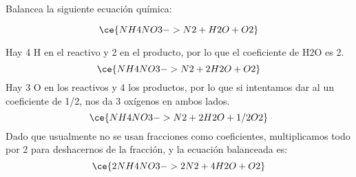 Balancea la siguiente ecuación química:

\[
    \ce{NH4NO3 -> N2 + H2O + O2}
\]

\begin{solutionbox}{8cm}
    Hay 4 H en el reactivo y 2 en el producto, por lo que el coeficiente de H2O es 2.
    \[
        \ce{NH4NO3 -> N2 + 2H2O + O2}
    \]
    Hay 3 O en los reactivos y 4 los productos, por lo que si intentamos dar al  un coeficiente de 1/2, nos da 3 oxígenos en ambos lados.
    \[
        \ce{NH4NO3 -> N2 + 2H2O + 1/2O2}
    \]
    Dado que usualmente no se usan fracciones como coeficientes, multiplicamos todo por 2 para deshacernos de la fracción, y la ecuación balanceada es:
    \[
        \ce{2NH4NO3 -> 2N2 + 4H2O + O2}
    \]
\end{solutionbox}